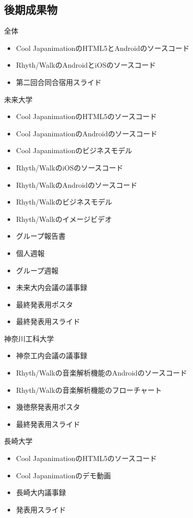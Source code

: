 \subsection{後期成果物}

全体
\begin{itemize}
\item Cool JapanimationのHTML5とAndroidのソースコード
\item Rhyth/WalkのAndroidとiOSのソースコード
\item 第二回合同合宿用スライド
\end{itemize}

未来大学
\begin{itemize}
\item Cool JapanimationのHTML5のソースコード
\item Cool JapanimationのAndroidのソースコード
\item Cool Japanimationのビジネスモデル
\item Rhyth/WalkのiOSのソースコード
\item Rhyth/WalkのAndroidのソースコード
\item Rhyth/Walkのビジネスモデル
\item Rhyth/Walkのイメージビデオ
\item グループ報告書
\item 個人週報
\item グループ週報
\item 未来大内会議の議事録
\item 最終発表用ポスタ
\item 最終発表用スライド
\end{itemize}

神奈川工科大学
\begin{itemize}
\item 神奈工内会議の議事録
\item Rhyth/Walkの音楽解析機能のAndroidのソースコード
\item Rhyth/Walkの音楽解析機能のフローチャート
\item 幾徳祭発表用ポスタ
\item 最終発表用スライド
\end{itemize}

長崎大学
\begin{itemize}
\item Cool JapanimationのHTML5のソースコード
\item Cool Japanimationのデモ動画
\item 長崎大内議事録
\item 発表用スライド
\end{itemize}

